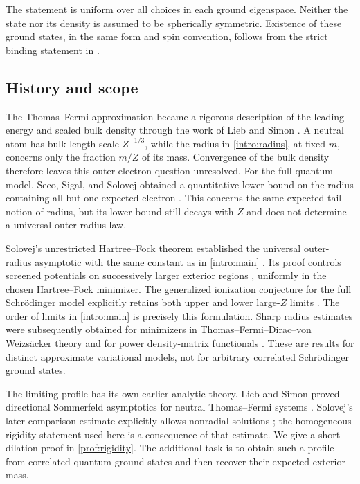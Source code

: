 The statement is uniform over all choices in each ground eigenspace.
Neither the state nor its density is assumed to be spherically symmetric.
Existence of these ground states, in the same form and spin convention,
follows from the strict binding statement in
\cite[\FoundationBinding]{OuterRadius}.

\subsection{History and scope}

The Thomas--Fermi approximation became a rigorous description of the
leading energy and scaled bulk density through the work of Lieb and
Simon \cite[Theorems~III.1 and~III.3]{LiebSimon1977}.
A neutral atom has bulk length scale
$Z^{-1/3}$, while the radius in \eqref{intro:radius}, at fixed $m$,
concerns only the fraction $m/Z$ of its mass.  Convergence of the bulk
density therefore leaves this outer-electron question unresolved.
For the full quantum model, Seco, Sigal, and Solovej obtained a
quantitative lower bound on the radius containing all but one expected
electron \cite[Theorem~3]{SecoSigalSolovej1990}.  This concerns the same
expected-tail notion of radius, but its lower bound still decays with $Z$
and does not determine a universal outer-radius law.

Solovej's unrestricted Hartree--Fock theorem established the universal
outer-radius asymptotic with the same constant as in
\cref{intro:main} \cite[Definition~1.2 and Theorem~1.5]{Solovej2003}.
Its proof controls screened potentials on successively larger exterior
regions \cite[Sections~10--13]{Solovej2003}, uniformly in the chosen
Hartree--Fock minimizer.  The generalized ionization conjecture for the
full Schr\"odinger model explicitly retains both upper and lower
large-$Z$ limits \cite[Section~3, Equation~(2)]{Solovej2016}.
The order of limits in \cref{intro:main} is precisely this formulation.
Sharp radius estimates were subsequently obtained for minimizers in
Thomas--Fermi--Dirac--von Weizs\"acker theory
\cite[Theorem~1.3]{FrankNamVanDenBosch2018} and for power density-matrix
functionals \cite[Theorem~3]{Kehle2017}.  These are results for distinct
approximate variational models, not for arbitrary correlated
Schr\"odinger ground states.

The limiting profile has its own earlier analytic theory.  Lieb and
Simon proved directional Sommerfeld asymptotics for neutral
Thomas--Fermi systems \cite[Theorem~IV.10]{LiebSimon1977}.
Solovej's later comparison estimate explicitly allows nonradial
solutions \cite[Lemma~4.4 and Remark~4.5]{Solovej2003}; the homogeneous
rigidity statement used here is a consequence of that estimate.
We give a short dilation proof in \cref{prof:rigidity}.  The additional
task is to obtain such a profile from correlated quantum ground states
and then recover their expected exterior mass.

